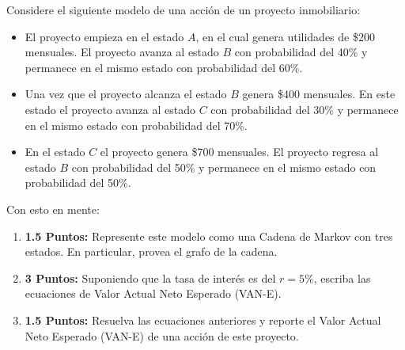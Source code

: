 \documentclass[ a4paper, twoside, 11pt]{article}
\begin{document}
\begin{problem}
Considere el siguiente modelo de una acci\'on de un proyecto inmobiliario: 
\begin{itemize}
\item El proyecto empieza en el estado $A$, en el cual genera utilidades de \$200 mensuales. \linebreak El proyecto avanza al estado $B$ con probabilidad del 40\% y permanece en el mismo estado con probabilidad del 60\%. 
\item Una vez que el proyecto alcanza el estado $B$ genera \$400 mensuales. En este estado el proyecto avanza al estado $C$ con probabilidad del 30\% y permanece en el mismo estado con probabilidad del 70\%. 
\item En el estado $C$ el proyecto genera \$700 mensuales. El proyecto regresa al estado $B$ con probabilidad del 50\% y permanece en el mismo estado con probabilidad del 50\%. 
\end{itemize}

Con esto en mente: 
\begin{enumerate}[label=\textbf{\alph*)}]
\item \textbf{1.5 Puntos:} Represente este modelo como una Cadena de Markov con tres estados. \linebreak En particular, provea el grafo de la cadena. 
\item \textbf{3 Puntos:} Suponiendo que la tasa de inter\'es es del $r = 5\%$, escriba las ecuaciones de Valor Actual Neto Esperado (VAN-E). 
\item \textbf{1.5 Puntos:} Resuelva las ecuaciones anteriores y reporte el Valor Actual Neto Esperado (VAN-E) de una acci\'on de este proyecto. 
\end{enumerate}

\end{problem}
\fullskip
\end{document}

